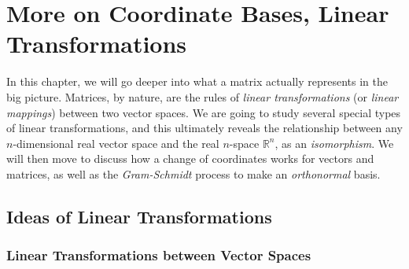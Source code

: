 \chapter{More on Coordinate Bases, Linear Transformations}
\label{chap:6x}

In this chapter, we will go deeper into what a matrix actually represents in the big picture. Matrices, by nature, are the rules of \textit{linear transformations} (or \textit{linear mappings}) between two vector spaces. We are going to study several special types of linear transformations, and this ultimately reveals the relationship between any $n$-dimensional real vector space and the real $n$-space $\mathbb{R}^n$, as an \textit{isomorphism}. We will then move to discuss how a change of coordinates works for vectors and matrices, as well as the \textit{Gram-Schmidt} process to make an \textit{orthonormal} basis.

\section{Ideas of Linear Transformations}
\label{section:lineartrans}

\subsection{Linear Transformations between Vector Spaces}

